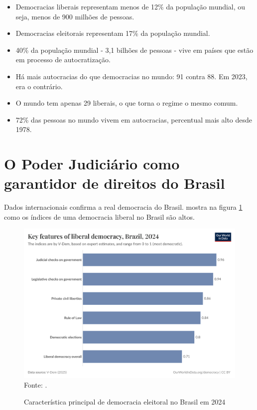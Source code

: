 \begin{itemize}
    \item Democracias liberais representam menos de 12\% da população mundial, ou seja, menos de 900 milhões de pessoas.
    \item Democracias eleitorais representam 17\% da população mundial.
    \item 40\%  da população mundial - 3,1 bilhões de pessoas - vive em países que estão em processo de autocratização.
    \item Há mais autocracias do que democracias no mundo: 91 contra 88. Em 2023, era o contrário.
    \item O mundo tem apenas 29 liberais, o que torna o regime o mesmo comum.
    \item 72\% das pessoas no mundo vivem em autocracias, percentual mais alto desde 1978.
\end{itemize}

\section{O Poder Judiciário como garantidor de direitos do Brasil}

Dados internacionais confirma a real democracia do Brasil. \cite{rule-of-law-index} mostra na figura \ref{fig:key-features-of-liberal-democracy} como os índices de uma democracia liberal no Brasil são altos.

\begin{figure}[H]
	\centering
	\caption{Característica principal de democracia eleitoral no Brasil em 2024}
	\includegraphics[width=1\linewidth]{figuras/key-features-of-liberal-democracy.png}
	\label{fig:key-features-of-liberal-democracy}
	\footnotesize{Fonte: \cite{rule-of-law-index}.}
\end{figure}


